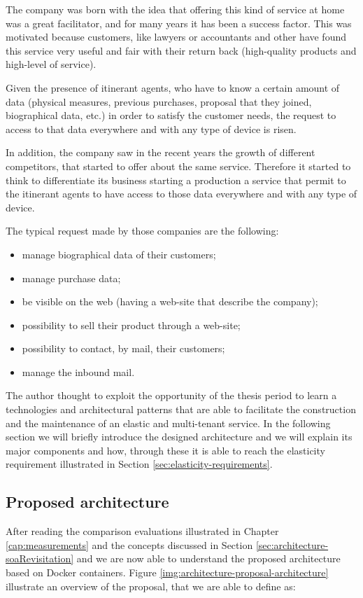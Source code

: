 The company was born with the idea that offering this kind of service at home was a great facilitator,
and for many years it has been a success factor. This was motivated because customers, like lawyers or
accountants and other have found this service very useful and fair with their return back (high-quality
products and high-level of service).

Given the presence of itinerant agents, who have to know a certain amount of data (physical measures,
previous purchases, proposal that they joined, biographical data, etc.) in order to satisfy the customer
needs, the request to access to that data everywhere and with any type of device is risen.

In addition, the company saw in the recent years the growth of different competitors, that started to offer
about the same service. Therefore it started to think to differentiate its business starting a production
a service that permit to the itinerant agents to have access to those data everywhere and with any type
of device.

The typical request made by those companies are the following:

\begin{itemize}
	\item{manage biographical data of their customers;}
	\item{manage purchase data;}
	\item{be visible on the web (having a web-site that describe the company);}
	\item{possibility to sell their product through a web-site;}
	\item{possibility to contact, by mail, their customers;}
	\item{manage the inbound mail.}
\end{itemize}

The author thought to exploit the opportunity of the thesis period to learn a technologies and architectural
patterns that are able to facilitate the construction and the maintenance of an elastic and multi-tenant
service. In the following section we will briefly introduce the designed architecture and we will explain
its major components and how, through these it is able to reach the elasticity requirement illustrated in
Section \ref{sec:elasticity-requirements}.

\subsection{Proposed architecture}
\label{sec:architecture-propoasal-architecture}
After reading the comparison evaluations illustrated in Chapter \ref{cap:measurements} and the concepts
discussed in Section \ref{sec:architecture-soaRevisitation} and we are now able to understand the proposed
architecture based on Docker containers. Figure \ref{img:architecture-proposal-architecture} illustrate an
overview of the proposal, that we are able to define as:

